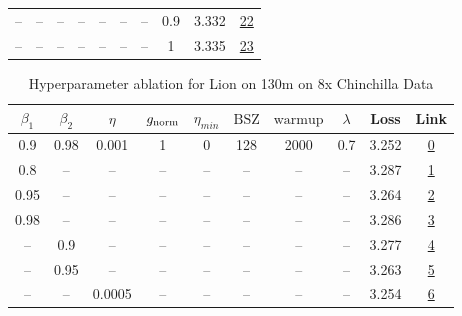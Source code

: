 \begin{table}[H]
\begin{tabular}{cccccccccc}
-- & -- & -- & -- & -- & -- & -- & 0.9 & 3.332 & \href{https://wandb.ai/marin-community/optimizer-scaling/runs/sweep-130m-10B-lionp2d5974lr0.001-wd0.9-minlr0-warmup2000-b10.9--c710cf}{22} \\
-- & -- & -- & -- & -- & -- & -- & 1 & 3.335 & \href{https://wandb.ai/marin-community/optimizer-scaling/runs/sweep-130m-10B-lionp58eb1dlr0.001-wd1-minlr0-warmup2000-b10.9-b2-be93de}{23} \\
\bottomrule
\end{tabular}
\end{table}

\begin{table}[H]
\centering
\caption{Hyperparameter ablation for Lion on 130m on 8x Chinchilla Data}
\label{tab:ablation_lion_130m_on_8x_chinchilla_data}
\begin{tabular}{cccccccccc}
\toprule
$\beta_1$ & $\beta_2$ & $\eta$ & $g_{\mathrm{norm}}$ & $\eta_{min}$ & $\mathrm{BSZ}$ & $\mathrm{warmup}$ & $\lambda$ & Loss & Link \\
\midrule
0.9 & 0.98 & 0.001 & 1 & 0 & 128 & 2000 & 0.7 & 3.252 & \href{https://wandb.ai/marin-community/optimizer-scaling/runs/sweep-130m-21B-lion85b813lr0.001-wd0.7-minlr0-warmup2000-b10.9-b-eef545}{0} \\
\midrule
0.8 & -- & -- & -- & -- & -- & -- & -- & 3.287 & \href{https://wandb.ai/marin-community/optimizer-scaling/runs/sweep-130m-21B-lionje7bccblr0.001-wd0.7-minlr0-warmup2000-b10.8--46199a}{1} \\
0.95 & -- & -- & -- & -- & -- & -- & -- & 3.264 & \href{https://wandb.ai/marin-community/optimizer-scaling/runs/sweep-130m-21B-lionjc17beflr0.001-wd0.7-minlr0-warmup2000-b10.95-bd5017}{2} \\
0.98 & -- & -- & -- & -- & -- & -- & -- & 3.286 & \href{https://wandb.ai/marin-community/optimizer-scaling/runs/sweep-130m-21B-liona1354cclr0.001-wd0.7-minlr0-warmup2000-b10.98-b74486}{3} \\
-- & 0.9 & -- & -- & -- & -- & -- & -- & 3.277 & \href{https://wandb.ai/marin-community/optimizer-scaling/runs/sweep-130m-21B-liona9ff1b8lr0.001-wd0.7-minlr0-warmup2000-b10.9--9c346c}{4} \\
-- & 0.95 & -- & -- & -- & -- & -- & -- & 3.263 & \href{https://wandb.ai/marin-community/optimizer-scaling/runs/sweep-130m-21B-lionje4e710lr0.001-wd0.7-minlr0-warmup2000-b10.9--f5263e}{5} \\
-- & -- & 0.0005 & -- & -- & -- & -- & -- & 3.254 & \href{https://wandb.ai/marin-community/optimizer-scaling/runs/sweep-130m-21B-lionja6ac62lr0.0005-wd0.7-minlr0-warmup2000-b10.9-39f7c0}{6} \\

\end{tabular}
\end{table}
